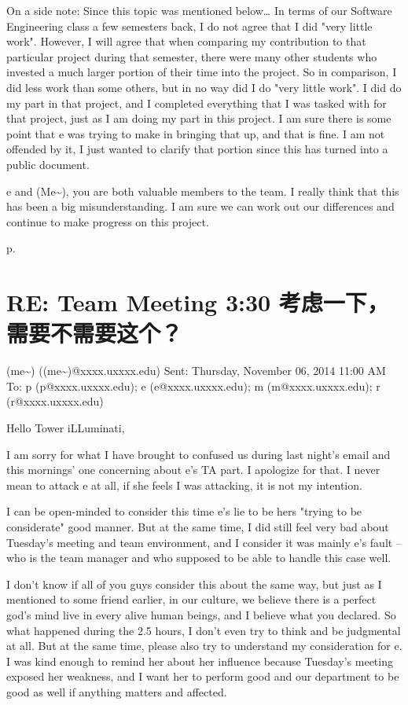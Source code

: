 \documentclass[12pt]{book}
\begin{document}
On a side note: Since this topic was mentioned below\ldots{} In terms of our Software Engineering class a few semesters back, I do not agree that I did "very little work". However, I will agree that when comparing my contribution to that particular project during that semester, there were many other students who invested a much larger portion of their time into the project. So in comparison, I did less work than some others, but in no way did I do "very little work". I did do my part in that project, and I completed everything that I was tasked with for that project,  just as I am doing my part in this project. I am sure there is some point that e was trying to make in bringing that up, and that is fine. I am not offended by it, I just wanted to clarify that portion since this has turned into a public document. 

e and (Me\textasciitilde{}), you are both valuable members to the team. I really think that this has been a big misunderstanding. I am sure we can work out our differences and continue to make progress on this project. 

p.

\section{RE: Team Meeting 3:30 考虑一下，需要不需要这个？}
\label{sec-22-5}
(me\textasciitilde{}) ((me\textasciitilde{})@xxxx.uxxxx.edu)
Sent:        Thursday, November 06, 2014 11:00 AM
To:        
p (p@xxxx.uxxxx.edu); e (e@xxxx.uxxxx.edu); m (m@xxxx.uxxxx.edu); r (r@xxxx.uxxxx.edu)

Hello Tower iLLuminati, 

I am sorry for what I have brought to confused us during last night's email and this mornings' one concerning about e's TA part. I apologize for that. I never mean to attack e at all, if she feels I was attacking, it is not my intention. 

I can be open-minded to consider this time e's lie to be hers "trying to be considerate" good manner. But at the same time, I did still feel very bad about Tuesday's meeting and team environment, and I consider it was mainly e's fault -- who is the team manager and who supposed to be able to handle this case well. 

I don't know if all of you guys consider this about the same way, but just as I mentioned to some friend earlier, in our culture, we believe there is a perfect god's mind live in every alive human beings, and I believe what you declared. So what happened during the 2.5 hours, I don't even try to think and be judgmental at all. But at the same time, please also try to understand my consideration for e. I was kind enough to remind her about her influence because Tuesday's meeting exposed her weakness, and I want her to perform good and our department to be good as well if anything matters and affected. 
\end{document}

